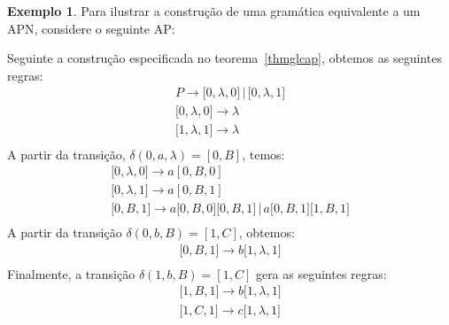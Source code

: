 \documentclass[a4paper]{article}
\theoremstyle{definition}
\newtheorem{Example}{Exemplo}
\begin{document}
  \begin{Example}
    Para ilustrar a construção de uma gramática equivalente a um APN, considere o seguinte AP:
    \begin{figure}[H]
      \centering
    \end{figure}
    Seguinte a construção especificada no teorema~\ref{thmglcap}, obtemos as
    seguintes regras:
    \[
      \begin{array}{l}
        P \to \lbrack 0,\lambda,0 \rbrack \,|\,\lbrack 0,\lambda,1 \rbrack\\
        \lbrack 0,\lambda,0 \rbrack \to \lambda \\
        \lbrack 1,\lambda,1 \rbrack \to \lambda \\
      \end{array}
    \]
    A partir da transição, $\delta(0,a,\lambda) = [0,B]$, temos:
    \[
      \begin{array}{l}
        \lbrack 0,\lambda,0 \rbrack \to a[0,B,0]\\
        \lbrack 0,\lambda,1 \rbrack \to a[0,B,1]\\
        \lbrack 0,B,1 \rbrack \to a\lbrack 0,B,0\rbrack \lbrack
        0,B,1\rbrack\,|\,a\lbrack 0,B,1\rbrack \lbrack 1,B,1\rbrack\\
      \end{array}
    \]
    A partir da transição $\delta(0,b,B) = [1,C]$, obtemos:
    \[
      \begin{array}{l}
        \lbrack 0,B,1\rbrack \to b\lbrack 1,\lambda,1\rbrack\\
      \end{array}
    \]
    Finalmente, a transição $\delta(1,b,B) = [1,C]$ gera as seguintes regras:
    \[
      \begin{array}{l}
        \lbrack 1,B,1\rbrack \to b\lbrack 1,\lambda,1\rbrack \\
        \lbrack 1,C,1\rbrack  \to c\lbrack 1,\lambda,1\rbrack\\
      \end{array}
    \]
  \end{Example}
  
\end{document}
